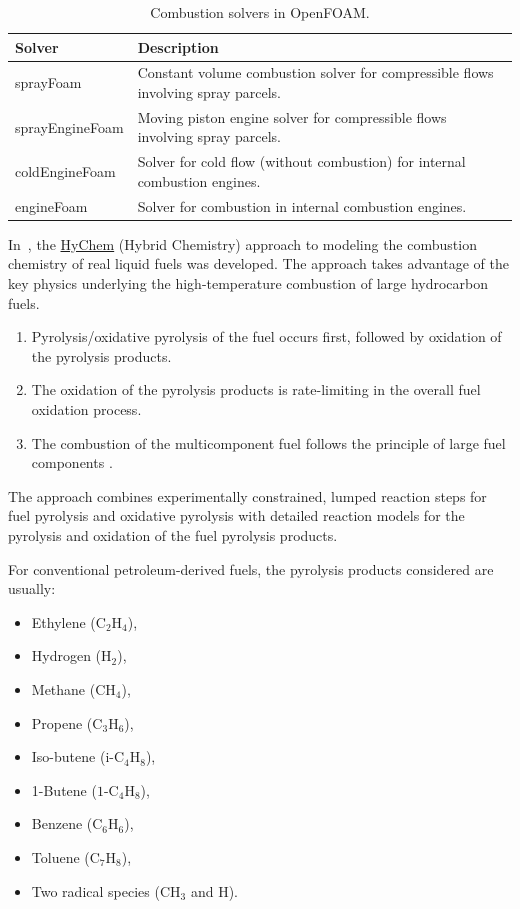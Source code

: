 \documentclass[12pt]{article}
\begin{document}
\begin{itemize}
\begin{table}[H]
    \centering
    \caption{Combustion solvers in OpenFOAM.}
    \label{tab:combustion-solvers}
    \begin{tabular}{lp{10cm}}
        \toprule
        \textbf{Solver} & \textbf{Description} \\
        \midrule
        sprayFoam & Constant volume combustion solver for compressible flows involving spray parcels. \\
        sprayEngineFoam & Moving piston engine solver for compressible flows involving spray parcels. \\
        coldEngineFoam & Solver for cold flow (without combustion) for internal combustion engines. \\
        engineFoam & Solver for combustion in internal combustion engines. \\
        \bottomrule
    \end{tabular}
\end{table}
%
In~\cite{wang2018physics,xu2018physics}, the \href{https://web.stanford.edu/group/haiwanglab/HyChem}{HyChem} (Hybrid Chemistry) approach to modeling the combustion chemistry of real liquid fuels was developed. The approach takes advantage of the key physics underlying the high-temperature combustion of large hydrocarbon fuels.

\begin{enumerate}
    \item Pyrolysis/oxidative pyrolysis of the fuel occurs first, followed by oxidation of the pyrolysis products.
    \item The oxidation of the pyrolysis products is rate-limiting in the overall fuel oxidation process.
    \item The combustion of the multicomponent fuel follows the principle of large fuel components \cite{xu2019principle}.
\end{enumerate}

The approach combines experimentally constrained, lumped reaction steps for fuel pyrolysis and oxidative pyrolysis with detailed reaction models for the pyrolysis and oxidation of the fuel pyrolysis products. 

For conventional petroleum-derived fuels, the pyrolysis products considered are usually:
\begin{itemize}
    \item Ethylene ($\text{C}_2\text{H}_4$),
    \item Hydrogen ($\text{H}_2$),
    \item Methane ($\text{CH}_4$),
    \item Propene ($\text{C}_3\text{H}_6$),
    \item Iso-butene ($\text{i-C}_4\text{H}_8$),
    \item 1-Butene ($\text{1-C}_4\text{H}_8$),
    \item Benzene ($\text{C}_6\text{H}_6$),
    \item Toluene ($\text{C}_7\text{H}_8$),
    \item Two radical species ($\text{CH}_3$ and $\text{H}$).
\end{itemize}


\end{itemize}
\end{document}

